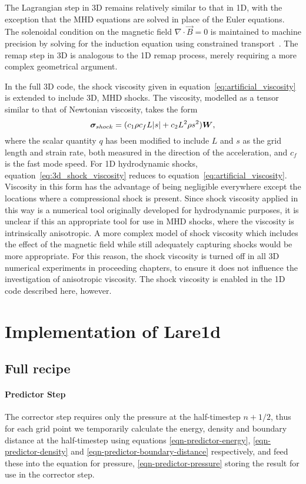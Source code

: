 The Lagrangian step in 3D remains relatively similar to that in 1D, with the exception that the MHD equations are solved in place of the Euler equations. The solenoidal condition on the magnetic field $\nabla \cdot \vec{B} =0$ is maintained to machine precision by solving for the induction equation using constrained transport~\cite{evansSimulationMagnetohydrodynamicFlows1988a}. The remap step in 3D is analogous to the 1D remap process, merely requiring a more complex geometrical argument. 

In the full 3D code, the shock viscosity given in equation~\ref{eq:artificial_viscosity} is extended to include 3D, MHD shocks. The viscosity, modelled as a tensor similar to that of Newtonian viscosity, takes the form
\begin{equation}
  \label{eq:3d_shock_viscosity}
{\bm \sigma}_{shock} = (c_1 \rho c_f L |s| + c_2 L^2 \rho s^2) {\bm W},
\end{equation}
where the scalar quantity $q$ has been modified to include $L$ and $s$ as the grid length and strain rate, both measured in the direction of the acceleration, and $c_f$ is the fast mode speed. For 1D hydrodynamic shocks, equation~\ref{eq:3d_shock_viscosity} reduces to equation~\ref{eq:artificial_viscosity}. Viscosity in this form has the advantage of being negligible everywhere except the locations where a compressional shock is present. Since shock viscosity applied in this way is a numerical tool originally developed for hydrodynamic purposes, it is unclear if this an appropriate tool for use in MHD shocks, where the viscosity is intrinsically anisotropic. A more complex model of shock viscosity which includes the effect of the magnetic field while still adequately capturing shocks would be more appropriate. For this reason, the shock viscosity is turned off in all 3D numerical experiments in proceeding chapters, to ensure it does not influence the investigation of anisotropic viscosity. The shock viscosity is enabled in the 1D code described here, however.

\section{Implementation of Lare1d}
\subsection{Full recipe}
\paragraph{Predictor Step}
The corrector step requires only the pressure at the half-timestep $n+1/2$, thus for each grid point we temporarily calculate the energy, density and boundary distance at the half-timestep using equations \eqref{eqn-predictor-energy}, \eqref{eqn-predictor-density} and \eqref{eqn-predictor-boundary-distance} respectively, and feed these into the equation for pressure, \eqref{eqn-predictor-pressure} storing the result for use in the corrector step.

